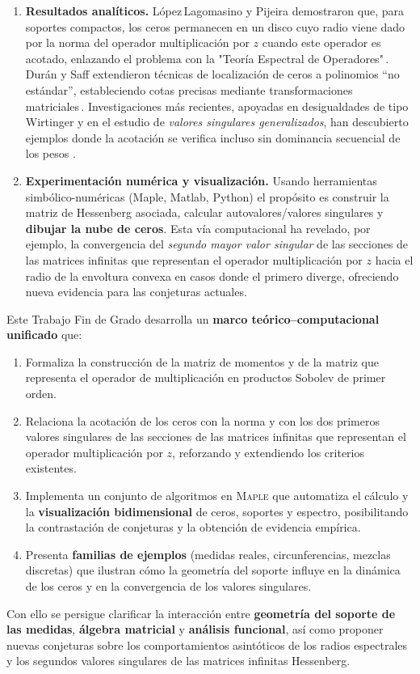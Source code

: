 \begin{enumerate}
  \item \textbf{Resultados analíticos.}
        López\,Lagomasino y Pijeira demostraron que, para soportes compactos, los ceros permanecen en un disco cuyo radio viene dado por la norma del operador multiplicación por $z$ cuando este operador es acotado, enlazando el problema con la "Teoría Espectral de Operadores"\,\cite{lagomasino2001sobolev}.
        Durán y Saff extendieron técnicas de localización de ceros a polinomios ``no estándar'', estableciendo cotas precisas mediante transformaciones matriciales\,\cite{DuranSaff2001}.
        Investigaciones más recientes, apoyadas en desigualdades de tipo Wirtinger y en el estudio de \emph{valores singulares generalizados}, han descubierto ejemplos donde la acotación se verifica incluso sin dominancia secuencial de los pesos \cite{escribano2025zeros,singularValuesOfHessenbergMatrices}.
  \item \textbf{Experimentación numérica y visualización.}
        Usando herramientas simbólico-numéricas (Maple, Matlab, Python) el propósito es construir la matriz de Hessenberg asociada, calcular autovalores/valores
        singulares y \textbf{dibujar la nube de ceros}. Esta vía computacional
        ha revelado, por ejemplo, la convergencia del \emph{segundo mayor valor singular} de las secciones de las matrices infinitas que representan el operador multiplicación por $z$
        hacia el radio de la envoltura convexa en casos donde el primero diverge,
        ofreciendo nueva evidencia para las conjeturas actuales.
\end{enumerate}

Este Trabajo Fin de Grado desarrolla un \textbf{marco teórico--computacional unificado} que:

\begin{enumerate}
  \item Formaliza la construcción de la matriz de momentos y de la matriz que representa el operador de multiplicación en productos Sobolev de primer orden.
  \item Relaciona la acotación de los ceros con la norma y con los dos primeros valores singulares de las secciones de las matrices infinitas que representan el operador multiplicación por $z$, reforzando y extendiendo los criterios existentes.
  \item Implementa un conjunto de algoritmos en \textsc{Maple} que automatiza el cálculo y la \textbf{visualización bidimensional} de ceros, soportes y espectro, posibilitando la contrastación de conjeturas y la obtención de evidencia empírica.
  \item Presenta \textbf{familias de ejemplos} (medidas reales, circunferencias, mezclas discretas) que ilustran cómo la geometría del soporte influye en la dinámica de los ceros y en la convergencia de los valores singulares.
\end{enumerate}

Con ello se persigue clarificar la interacción entre \textbf{geometría del soporte de las medidas}, \textbf{álgebra matricial} y \textbf{análisis funcional}, así como proponer nuevas conjeturas sobre los comportamientos asintóticos de los radios espectrales y los segundos valores singulares de las matrices infinitas Hessenberg.